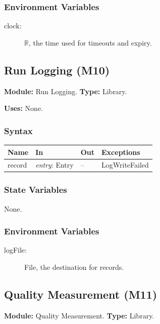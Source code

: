 \documentclass[12pt, titlepage]{article}
\begin{document}
\subsubsection*{Environment Variables}

\begin{description}
\item[clock:] $\mathbb{R}$, the time used for timeouts and expiry.
\end{description}

\newpage
\subsection{Run Logging (M10)}\label{mLog}

\textbf{Module:} Run Logging. \textbf{Type:} Library.

\textbf{Uses:} None.

\subsubsection*{Syntax}

\begin{tabularx}{\textwidth}{l X l X}
\toprule
\textbf{Name} & \textbf{In} & \textbf{Out} & \textbf{Exceptions}\\
\midrule
record & \emph{entry}: Entry & -- & LogWriteFailed\\
\bottomrule
\end{tabularx}

\subsubsection*{State Variables}

None.

\subsubsection*{Environment Variables}

\begin{description}
\item[logFile:] File, the destination for records.
\end{description}

\newpage
\subsection{Quality Measurement (M11)}\label{mQuality}

\textbf{Module:} Quality Measurement. \textbf{Type:} Library.
\end{document}
